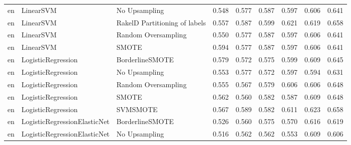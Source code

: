 \begin{tabular}{lllllllll}
      en &                       LinearSVM &                 No Upsampling & 0.548 &                     0.577 &                 0.587 &                  0.597 &                                   0.606 &     0.641 \\
      en &                       LinearSVM & RakelD Partitioning of labels & 0.557 &                     0.587 &                 0.599 &                  0.621 &                                   0.619 &     0.658 \\
      en &                       LinearSVM &           Random Oversampling & 0.550 &                     0.577 &                 0.587 &                  0.597 &                                   0.606 &     0.641 \\
      en &                       LinearSVM &                         SMOTE & 0.594 &                     0.577 &                 0.587 &                  0.597 &                                   0.606 &     0.641 \\
      en &              LogisticRegression &               BorderlineSMOTE & 0.579 &                     0.572 &                 0.575 &                  0.599 &                                   0.609 &     0.645 \\
      en &              LogisticRegression &                 No Upsampling & 0.553 &                     0.577 &                 0.572 &                  0.597 &                                   0.594 &     0.631 \\
      en &              LogisticRegression &           Random Oversampling & 0.555 &                     0.567 &                 0.579 &                  0.606 &                                   0.606 &     0.648 \\
      en &              LogisticRegression &                         SMOTE & 0.562 &                     0.560 &                 0.582 &                  0.587 &                                   0.609 &     0.648 \\
      en &              LogisticRegression &                      SVMSMOTE & 0.567 &                     0.589 &                 0.582 &                  0.611 &                                   0.623 &     0.658 \\
      en &    LogisticRegressionElasticNet &               BorderlineSMOTE & 0.526 &                     0.560 &                 0.575 &                  0.570 &                                   0.616 &     0.619 \\
      en &    LogisticRegressionElasticNet &                 No Upsampling & 0.516 &                     0.562 &                 0.562 &                  0.553 &                                   0.609 &     0.606 \\

\end{tabular}
